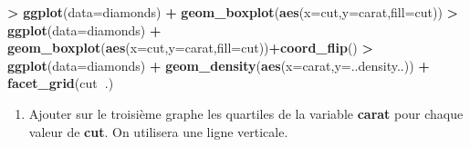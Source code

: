 \documentclass[]{article}
\newenvironment{Shaded}{\begin{snugshade}}{\end{snugshade}}
\newcommand{\DataTypeTok}[1]{\textcolor[rgb]{0.13,0.29,0.53}{#1}}
\newcommand{\KeywordTok}[1]{\textcolor[rgb]{0.13,0.29,0.53}{\textbf{#1}}}
\newcommand{\NormalTok}[1]{#1}
\newcommand{\OperatorTok}[1]{\textcolor[rgb]{0.81,0.36,0.00}{\textbf{#1}}}
\newcommand{\StringTok}[1]{\textcolor[rgb]{0.31,0.60,0.02}{#1}}
\providecommand{\tightlist}{%
  \setlength{\itemsep}{0pt}\setlength{\parskip}{0pt}}
\theoremstyle{definition}
\theoremstyle{definition}
\theoremstyle{definition}
\theoremstyle{remark}
\begin{document}
\begin{Shaded}
\begin{Highlighting}[]
\OperatorTok{>}\StringTok{ }\KeywordTok{ggplot}\NormalTok{(}\DataTypeTok{data=}\NormalTok{diamonds) }\OperatorTok{+}\StringTok{ }\KeywordTok{geom_boxplot}\NormalTok{(}\KeywordTok{aes}\NormalTok{(}\DataTypeTok{x=}\NormalTok{cut,}\DataTypeTok{y=}\NormalTok{carat,}\DataTypeTok{fill=}\NormalTok{cut)) }
\OperatorTok{>}\StringTok{ }\KeywordTok{ggplot}\NormalTok{(}\DataTypeTok{data=}\NormalTok{diamonds) }\OperatorTok{+}\StringTok{ }\KeywordTok{geom_boxplot}\NormalTok{(}\KeywordTok{aes}\NormalTok{(}\DataTypeTok{x=}\NormalTok{cut,}\DataTypeTok{y=}\NormalTok{carat,}\DataTypeTok{fill=}\NormalTok{cut))}\OperatorTok{+}\KeywordTok{coord_flip}\NormalTok{()}
\OperatorTok{>}\StringTok{ }\KeywordTok{ggplot}\NormalTok{(}\DataTypeTok{data=}\NormalTok{diamonds) }\OperatorTok{+}\StringTok{ }\KeywordTok{geom_density}\NormalTok{(}\KeywordTok{aes}\NormalTok{(}\DataTypeTok{x=}\NormalTok{carat,}\DataTypeTok{y=}\NormalTok{..density..)) }\OperatorTok{+}\StringTok{  }\KeywordTok{facet_grid}\NormalTok{(cut}\OperatorTok{~}\NormalTok{.)}
\end{Highlighting}
\end{Shaded}

\begin{enumerate}
\def\labelenumi{\arabic{enumi}.}
\setcounter{enumi}{1}
\tightlist
\item
  Ajouter sur le troisième graphe les quartiles de la variable \textbf{carat} pour chaque valeur de \textbf{cut}. On utilisera une ligne verticale.
\end{enumerate}
\end{document}
